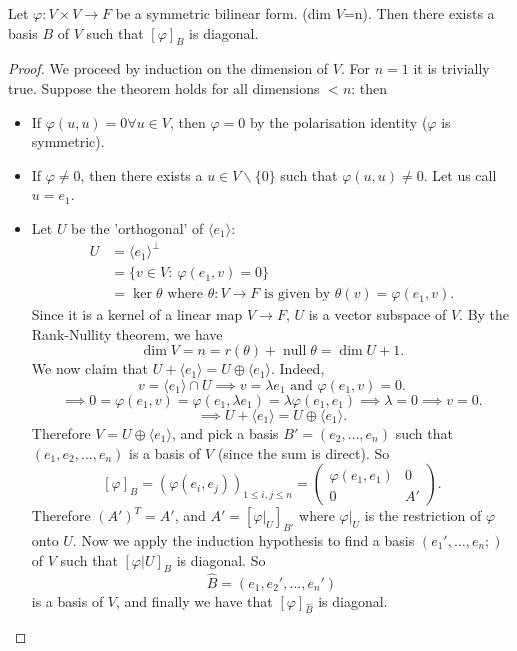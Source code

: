 \documentclass[a4paper]{scrartcl}
\begin{document}
\begin{theorem}
     Let $\varphi: V \times V \rightarrow F$ be a symmetric bilinear form. (dim $V$=n). Then there exists a basis $B$ of $V$ such that $[\varphi]_B$ is diagonal.
\end{theorem}
\begin{proof}
     We proceed by induction on the dimension of $V$. For $n=1$ it is trivially true. Suppose the theorem holds for all dimensions $<n$: then
     \begin{itemize}
         \item If $\varphi (u,u)=0 \forall u \in V$, then $\varphi=0$ by the polarisation identity ($\varphi $ is symmetric).
         \item If $\varphi \neq 0$, then there exists a $u \in V \backslash \{0\}$ such that $\varphi (u,u) \neq 0$. Let us call $u=e_1$.
         \item Let $U$ be the 'orthogonal' of $\langle e_1 \rangle $: 
         \begin{equation*}
               \begin{split}
                    U&=\langle e_1 \rangle^\perp \\
                    &=\{v \in V: \ \varphi (e_1,v)=0\}\\
                    &=\operatorname{ker} \theta \text{ where } \theta:V \rightarrow F \text{ is given by } \theta (v)= \varphi (e_1,v).
               \end{split}
         \end{equation*}
         Since it is a kernel of a linear map $V \rightarrow F$, $U$ is a vector subspace of $V$. By the Rank-Nullity theorem, we have 
         \[\operatorname{dim} V=n= r(\theta)+ \operatorname{null}  \theta=\operatorname{dim}U+1.\]
         We now claim that $U+\langle e_1 \rangle =U \oplus \langle e_1 \rangle $. Indeed, 
         \[v= \langle e_1 \rangle  \cap U \implies v= \lambda e_1 \text{ and }  \varphi(e_1,v)=0 .\]
         \[\implies 0=\varphi (e_1,v)=\varphi (e_1, \lambda e_1)=\lambda \varphi (e_1,e_1) \implies \lambda=0 \implies v=0.\]
         \[\implies U+\langle e_1 \rangle =U \oplus \langle e_1 \rangle .\]
         Therefore $V=U \oplus \langle e_1 \rangle $, and pick a basis $B'=(e_2, \ldots ,e_n)$ such that $(e_1, e_2, \ldots , e_n)$ is a basis of $V$ (since the sum is direct). So 
         \[[\varphi]_B=(\varphi(e_i,e_j))_{1 \leq i,j \leq n}=\left(
          \begin{array}{c|c}
          \varphi (e_1,e_1) &0\\
            \hline
            0&A'
          \end{array}
          \right)
         .\]
         Therefore $(A')^T=A'$, and 
         $A'=[\varphi|_U]_{B'}$ where $\varphi|_U$ is the restriction of $\varphi$ onto $U$. Now we apply the induction hypothesis to find a basis $(e_1', \ldots ,e_n;)$ of $V$ such that $[\varphi|U]_{B}$ is diagonal. So 
         \[\hat{B}=(e_1,e_2',\ldots ,e_n')\] is a basis of $V$, and finally we have that $[\varphi]_{\hat{B}}$ is diagonal.      
     \end{itemize}
\end{proof}
\end{document}
